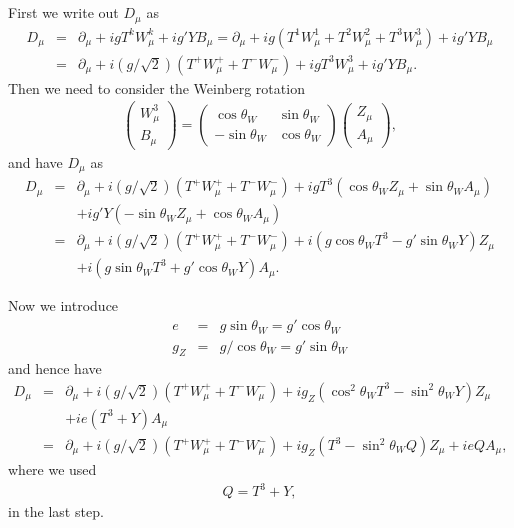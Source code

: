 \documentclass[11pt]{article}
\def\del{{\partial}}
\begin{document}
\section{ }
First we write out $D_\mu$ as
\begin{eqnarray}
  D_\mu
  &=&\del_\mu +i g T^k W^k_\mu + i g' Y B_\mu
  =\del_\mu +ig(T^1W^1_\mu+T^2W^2_\mu+T^3W^3_\mu) +ig'YB_\mu \nonumber \\
  &=&\del_\mu +i(g/\sqrt2)(T^+W^+_\mu + T^-W^-_\mu)
            +igT^3 W^3_\mu +ig'Y  B_\mu.
\end{eqnarray}
Then we need to consider the Weinberg rotation
\begin{eqnarray}
  \begin{pmatrix}
    W^3_\mu \\  B_\mu
  \end{pmatrix}
  =
  \begin{pmatrix}
    \cos\theta_W & \sin\theta_W \\
    -\sin\theta_W & \cos\theta_W
  \end{pmatrix}
  \begin{pmatrix}
    Z_\mu \\ A_\mu
  \end{pmatrix},
\end{eqnarray}
and have $D_\mu$ as
\begin{eqnarray}
  D_\mu
   &=&\del_\mu +i(g/\sqrt2)(T^+W^+_\mu + T^-W^-_\mu)
            +igT^3 ( \cos\theta_W Z_\mu + \sin\theta_W A_\mu) \nonumber \\
           &&+ig'Y  (-\sin\theta_W Z_\mu + \cos\theta_W A_\mu)\nonumber \\
  &=&\del_\mu +i(g/\sqrt2)(T^+W^+_\mu + T^-W^-_\mu)
            +i(g\cos\theta_W T^3 -g'\sin\theta_W Y) Z_\mu\nonumber \\
            &&+i(g\sin\theta_W T^3 +g'\cos\theta_W Y) A_\mu.
\end{eqnarray}

Now we introduce
\begin{eqnarray}
  e &=& g\sin\theta_W = g'\cos\theta_W \\
  g_Z&=&g/\cos\theta_W= g'\sin\theta_W 
\end{eqnarray}
and hence have
\begin{eqnarray}
  D_\mu
  &=&\del_\mu +i(g/\sqrt2)(T^+W^+_\mu + T^-W^-_\mu)
            +ig_Z(\cos^2\theta_W T^3 -\sin^2\theta_W Y) Z_\mu
            \nonumber \\ &&+ie(T^3 + Y) A_\mu \nonumber \\
  &=&\del_\mu +i(g/\sqrt2)(T^+W^+_\mu + T^-W^-_\mu)
            +ig_Z(T^3 -\sin^2\theta_W Q) Z_\mu
            +ieQ A_\mu,
\end{eqnarray}
where we used 
\begin{eqnarray}
  Q = T^3 + Y,
\end{eqnarray}
in the last step.
\end{document}
